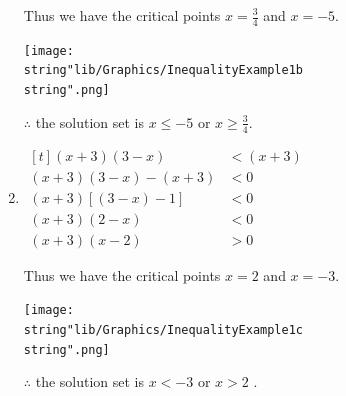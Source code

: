 \documentclass[11pt,a4paper]{book}
\begin{document}
\begin{example}
\begin{enumerate}[label=(\alph*)]
Thus we have the critical points ${\displaystyle x=\frac{3}{4}}$
and $x=-5$.
\begin{center}
\texttt{[image: \\string"lib/Graphics/InequalityExample1b\\string".png]}
\par\end{center}

$\therefore$ the solution set is ${\displaystyle x\leq-5}$ or ${\displaystyle x\geq\frac{3}{4}}$.

\item
$
\begin{aligned}[t]
\left(x+3\right)\left(3-x\right) & <\left(x+3\right)\\
\left(x+3\right)\left(3-x\right)-\left(x+3\right) & <0\\
\left(x+3\right)\left[\left(3-x\right)-1\right] & <0\\
\left(x+3\right)\left(2-x\right) & <0\\
\left(x+3\right)\left(x-2\right) & >0
\end{aligned}
$

Thus we have the critical points $x=2$ and $x=-3$.
\begin{center}
\texttt{[image: \\string"lib/Graphics/InequalityExample1c\\string".png]}
\par\end{center}

$\therefore$ the solution set is $x<-3$ or $x>2$ .

\end{enumerate}
\end{example}
\end{document}
